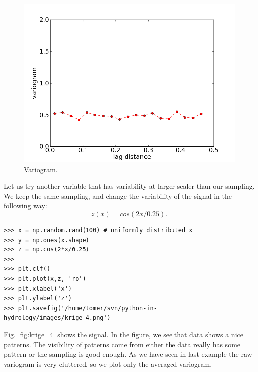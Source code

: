 \documentclass[10pt]{book}
\begin{document}
{\beforefig
\begin{figure}[!h]
  \centering
    \includegraphics[scale=0.5]{images/krige_3.png}
  \caption{Variogram.}
   \label{fig:krige_3}
\end{figure}
\afterfig

Let us try another variable that has variability at larger scaler than our sampling. We keep the same sampling, and change the variability of the signal in the following way:
\begin{equation}
z(x) = cos(2 x/0.25).
\end{equation}

\beforeverb \begin{verbatim}
>>> x = np.random.rand(100) # uniformly distributed x
>>> y = np.ones(x.shape) 
>>> z = np.cos(2*x/0.25) 
>>> 
>>> plt.clf()
>>> plt.plot(x,z, 'ro')
>>> plt.xlabel('x')
>>> plt.ylabel('z')
>>> plt.savefig('/home/tomer/svn/python-in-hydrology/images/krige_4.png')
\end{verbatim} \afterverb

Fig. \ref{fig:krige_4} shows the signal. In the figure, we see that data shows a nice patterns. The visibility of patterns come from either the data really has some pattern or the sampling is good enough. As we have seen in last example the raw variogram is very cluttered, so we plot only the averaged variogram. 

}
\end{document}
